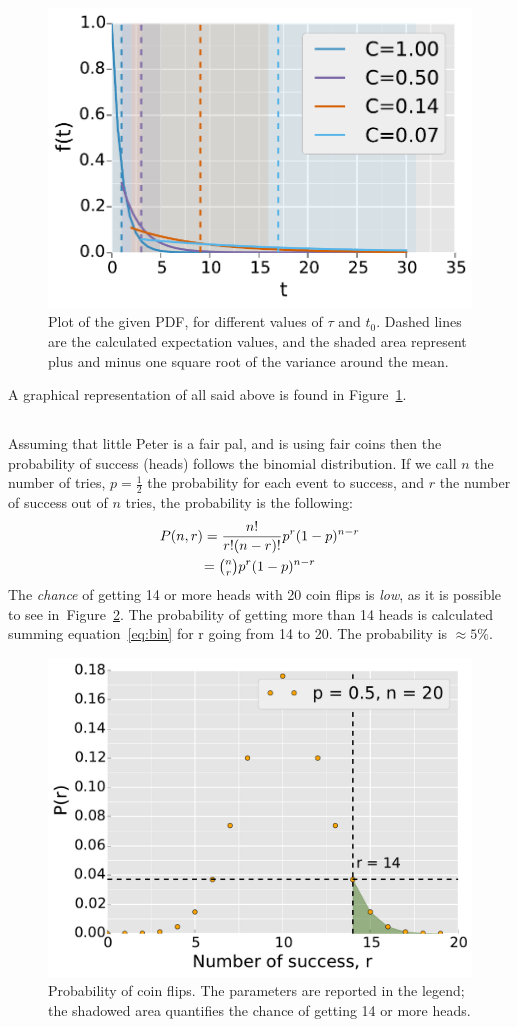 \documentclass[twocolumn]{article}
\begin{document}
	\begin{figure}[htb]
		\begin{center}
			\includegraphics[width= 0.45 \textwidth]{fig/graph.pdf}
		\end{center}
		\caption{Plot of the given PDF, for different values of $ \tau $ and $t_0 $. Dashed lines are the calculated expectation values, and the shaded area represent plus and minus one square root of the variance around the mean.}
		\label{fig:pdf}
	\end{figure}
	A graphical representation of all said above is found in Figure~\ref{fig:pdf}.
	\subsection{} %
	\label{sub:}
	Assuming that little Peter is a fair pal, and is using fair coins then the probability of success (heads) follows the binomial distribution.
	If we call $n$ the number of tries, $p= \frac{1}{2}$ the probability for each event to success, and $r$ the number of success out of $n$ tries, the probability is the following: 
	\begin{multline}
	\label{eq:bin}
		P (n,r) = \frac{n!}{r!(n-r)!} p ^ r (1-p)^{n-r} \\ 
		 = \tbinom n r p ^ r (1-p)^{n-r}
	\end{multline}
	The \emph{chance} of getting 14 or more heads with 20 coin flips is \emph{low}, as it is possible to see in~Figure~\ref{fig:lil}. The probability of getting more than 14 heads is calculated summing equation~\ref{eq:bin} for r going from 14 to 20.
	The probability is  $\approx 5 \% $.

	\begin{figure}[h]
		\begin{center}
			\includegraphics[width=.45 \textwidth]{fig/lil.pdf}
		\end{center}
		\caption{Probability of coin flips. The parameters are reported in the legend; the shadowed area quantifies the chance of getting 14 or more heads.}
		\label{fig:lil}
	\end{figure}
\end{document}
